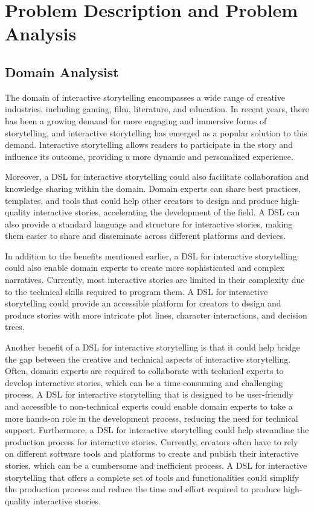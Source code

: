 \chapter{Problem Description and Problem Analysis}

\section{Domain Analysist} 
The domain of interactive storytelling encompasses a wide range of creative industries, including gaming, film, literature, and education. In recent years, there has been a growing demand for more engaging and immersive forms of storytelling, and interactive storytelling has emerged as a popular solution to this demand. Interactive storytelling allows readers to participate in the story and influence its outcome, providing a more dynamic and personalized experience.


Moreover, a DSL for interactive storytelling could also facilitate collaboration and knowledge sharing within the domain. Domain experts can share best practices, templates, and tools that could help other creators to design and produce high-quality interactive stories, accelerating the development of the field. A DSL can also provide a standard language and structure for interactive stories, making them easier to share and disseminate across different platforms and devices.

In addition to the benefits mentioned earlier, a DSL for interactive storytelling could also enable domain experts to create more sophisticated and complex narratives. Currently, most interactive stories are limited in their complexity due to the technical skills required to program them. A DSL for interactive storytelling could provide an accessible platform for creators to design and produce stories with more intricate plot lines, character interactions, and decision trees.

Another benefit of a DSL for interactive storytelling is that it could help bridge the gap between the creative and technical aspects of interactive storytelling. Often, domain experts are required to collaborate with technical experts to develop interactive stories, which can be a time-consuming and challenging process. A DSL for interactive storytelling that is designed to be user-friendly and accessible to non-technical experts could enable domain experts to take a more hands-on role in the development process, reducing the need for technical support.
Furthermore, a DSL for interactive storytelling could help streamline the production process for interactive stories. Currently, creators often have to rely on different software tools and platforms to create and publish their interactive stories, which can be a cumbersome and inefficient process. A DSL for interactive storytelling that offers a complete set of tools and functionalities could simplify the production process and reduce the time and effort required to produce high-quality interactive stories.

